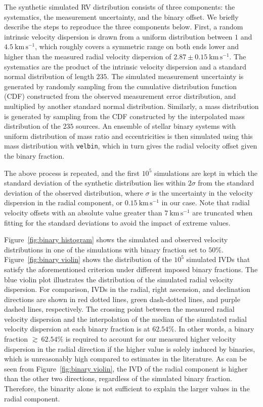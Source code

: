 \documentclass[12pt]{ucsddissertation}
\begin{document}
\begin{CJK*}{UTF8}{gbsn}
The synthetic simulated RV distribution consists of three components: the systematics, the measurement uncertainty, and the binary offset. We briefly describe the steps to reproduce the three components below. First, a random intrinsic velocity dispersion is drawn from a uniform distribution between $1$ and $4.5~\mathrm{km}\,\mathrm{s}^{-1}$, which roughly covers a symmetric range on both ends lower and higher than the measured radial velocity dispersion of $2.87\pm0.15~\mathrm{km}\,\mathrm{s}^{-1}$. The systematics are the product of the intrinsic velocity dispersion and a standard normal distribution of length $235$. The simulated measurement uncertainty is generated by randomly sampling from the cumulative distribution function (CDF) constructed from the observed measurement error distribution, and multiplied by another standard normal distribution. Similarly, a mass distribution is generated by sampling from the CDF constructed by the interpolated mass distribution of the $235$ sources. An ensemble of stellar binary systems with uniform distribution of mass ratio and eccentricities is then simulated using this mass distribution with \texttt{velbin}, which in turn gives the radial velocity offset given the binary fraction.

The above process is repeated, and the first $10^5$ simulations are kept in which the standard deviation of the synthetic distribution lies within $2\sigma$ from the standard deviation of the observed distribution, where $\sigma$ is the uncertainty in the velocity dispersion in the radial component, or $0.15~\mathrm{km}\,\mathrm{s}^{-1}$ in our case. Note that radial velocity offsets with an absolute value greater than $7~\mathrm{km}\,\mathrm{s}^{-1}$ are truncated when fitting for the standard deviations to avoid the impact of extreme values.

Figure~\ref{fig:binary histogram} shows the simulated and observed velocity distributions in one of the simulations with binary fraction set to $50\%$. Figure~\ref{fig:binary violin} shows the distribution of the $10^5$ simulated IVDs that satisfy the aforementioned criterion under different imposed binary fractions. The blue violin plot illustrates the distribution of the simulated radial velocity dispersion. For comparison, IVDs in the radial, right ascension, and declination directions are shown in red dotted lines, green dash-dotted lines, and purple dashed lines, respectively. The crossing point between the measured radial velocity dispersion and the interpolation of the median of the simulated radial velocity dispersion at each binary fraction is at $62.54\%$. In other words, a binary fraction $\gtrsim~62.54\%$ is required to account for our measured higher velocity dispersion in the radial direction if the higher value is solely induced by binaries, which is unreasonably high compared to estimates in the literature. As can be seen from Figure~\ref{fig:binary violin}, the IVD of the radial component is higher than the other two directions, regardless of the simulated binary fraction. Therefore, the binarity alone is not sufficient to explain the larger values in the radial component. 



\end{CJK*}
\end{document}
